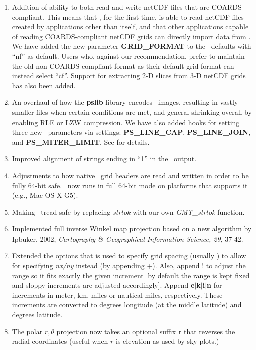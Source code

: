\begin{enumerate}
\item Addition of ability to both read and write netCDF files that are COARDS compliant.  This means
that \GMT, for the first time, is able to read netCDF files created by applications other than itself,
and that other applications capable of reading COARDS-compliant netCDF grids can directly import data
from \GMT.  We have added the new parameter {\bf GRID\_FORMAT} to the  \GMT\ defaults with ``nf'' as default.
Users who, against our recommendation, prefer to maintain the old non-COARDS compliant format as their
default grid format can instead select ``cf''. Support for extracting 2-D slices from 3-D netCDF grids has
also been added.
\item An overhaul of how the {\bf pslib} library encodes \PS\ images, resulting in vastly smaller files when
certain conditions are met, and general shrinking overall by enabling RLE or LZW compression.  We
have also added hooks for setting three new \PS\ parameters via  settings:
{\bf PS\_LINE\_CAP}, {\bf PS\_LINE\_JOIN}, and {\bf PS\_MITER\_LIMIT}. See  for details.
\item Improved alignment of strings ending in ``1'' in the \PS\ output.
\item Adjustments to how native \GMT\ grid headers are read and written in order to be fully 64-bit safe.
\GMT\ now runs in full 64-bit mode on platforms that supports it (e.g., Mac OS X G5).
\item Making \GMT\ tread-safe by replacing {\it strtok} with our own {\it GMT\_strtok} function.
\item Implemented full inverse Winkel map projection based on a new algorithm by Ipbuker, 2002,
{\it Cartography \& Geographical Information Science, 29}, 37-42.
\item Extended the options that is used to specify grid spacing (usually ) to allow for
specifying {\it nx/ny} instead (by appending +).  Also, append ! to adjust the range so it fits exactly the
given increment [by default the range is kept fixed and sloppy increments are adjusted accordingly].
Append {\bf e}$|${\bf k}$|${\bf i}$|${\bf n} for increments in meter, km, miles
or nautical miles, respectively.  These increments are converted to degrees
longitude (at the middle latitude) and degrees latitude.
\item The polar $r, \theta$ projection  now takes an optional suffix {\bf r} that reverses the
radial coordinates (useful when $r$ is elevation as used by sky plots.)

\end{enumerate}
